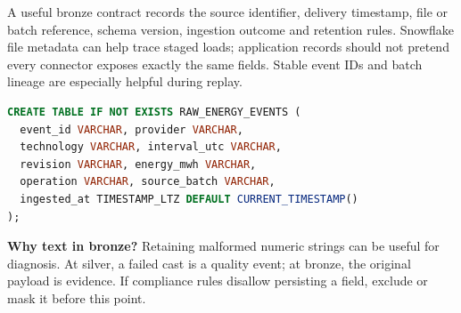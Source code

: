 \documentclass[11pt,twoside]{article}
\begin{document}
A useful bronze contract records the source identifier, delivery timestamp, file or batch reference, schema version, ingestion outcome and retention rules. Snowflake file metadata can help trace staged loads; application records should not pretend every connector exposes exactly the same fields. Stable event IDs and batch lineage are especially helpful during replay.
\begin{lstlisting}[language=SQL,caption={Illustrative bronze landing structure.}]
CREATE TABLE IF NOT EXISTS RAW_ENERGY_EVENTS (
  event_id VARCHAR, provider VARCHAR,
  technology VARCHAR, interval_utc VARCHAR,
  revision VARCHAR, energy_mwh VARCHAR,
  operation VARCHAR, source_batch VARCHAR,
  ingested_at TIMESTAMP_LTZ DEFAULT CURRENT_TIMESTAMP()
);
\end{lstlisting}
\textbf{Why text in bronze?} Retaining malformed numeric strings can be useful for diagnosis. At silver, a failed cast is a quality event; at bronze, the original payload is evidence. If compliance rules disallow persisting a field, exclude or mask it before this point.
\end{document}
